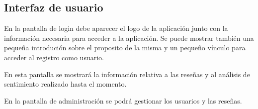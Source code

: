 
\subsection{Interfaz de usuario}
En la pantalla de login debe aparecer el logo de la aplicación 
junto con la información necesaria para acceder a la aplicación.
Se puede mostrar también una pequeña introdución sobre el proposito de la misma y 
un pequeño vínculo para acceder al registro como usuario.

En esta pantalla se mostrará la información relativa a las reseñas y al análisis de sentimiento realizado hasta el momento.


En la pantalla de administración se podrá gestionar los usuarios y las reseñas.

